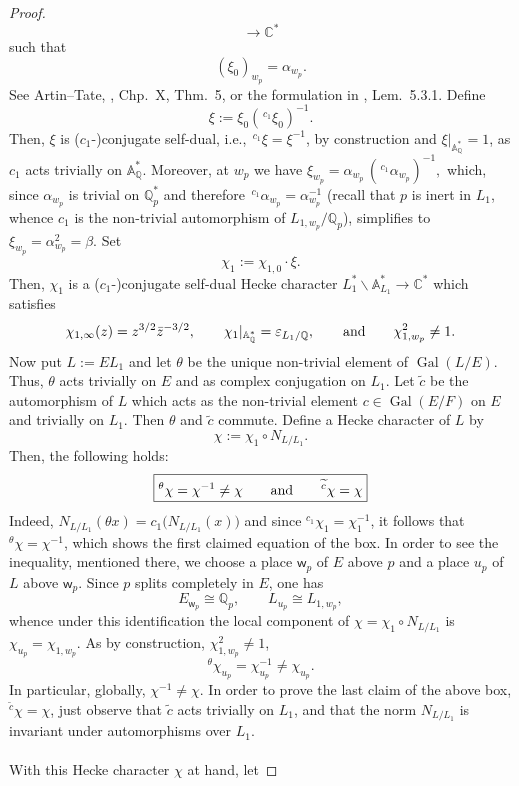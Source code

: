\documentclass[a4paper,10pt]{amsart}
\theoremstyle{definition}
\numberwithin{equation}{section}
\def\A{\mathbb A}
\def\Q{\mathbb Q}
\def\C{\mathbb C}
\def\ww{\mathsf w}
\begin{document}
\begin{proof}
$$        \longrightarrow \mathbb C^*
$$
such that
$$
        (\xi_0)_{w_p}=\alpha_{w_p} .
$$
See Artin--Tate, \cite{ArtinTate}, Chp.~X, Thm.~5, or the formulation in \cite{BCGNT}, Lem.\ 5.3.1.  Define
$$
        \xi:=\xi_0({}^{\,c_1}\xi_0)^{-1}.
$$
Then, $\xi$ is ($c_1$-)conjugate self-dual, i.e., ${}^{\,c_1}\xi=\xi^{-1}$, by construction and $\xi|_{\mathbb A_\mathbb Q^*}=1$, as \(c_1\) acts trivially on \(\mathbb A_\mathbb Q^*\). Moreover, at \(w_p\) we have $\xi_{w_p}=\alpha_{w_p}\,({}^{\,c_1}\alpha_{w_p})^{-1},$
which, since \(\alpha_{w_p}\) is trivial on \(\mathbb Q_p^*\) and therefore ${}^{\,c_1}\alpha_{w_p}=\alpha_{w_p}^{-1}$ (recall that $p$ is inert in $L_1$, whence $c_1$ is the non-trivial automorphism of $L_{1,w_p}/\Q_p$), simplifies to $\xi_{w_p} = \alpha_{w_p}^2 = \beta.$ Set
$$
        \chi_1:=\chi_{1,0}\cdot \xi.
$$
Then, $\chi_1$ is a ($c_1$-)conjugate self-dual Hecke character $L^*_1\backslash \A^*_{L_1}\rightarrow\C^*$ which satisfies
$$
        \chi_{1,\infty}(z)
        =
        z^{3/2}\bar z^{-3/2}, \quad\quad
        \chi_1|_{\mathbb A_\mathbb Q^*}
        =
        \varepsilon_{L_1/\mathbb Q},\quad\quad {\rm and} \quad\quad
        \chi_{1,w_p}^2\neq 1.
$$
Now put $L:=EL_1$ and let $\theta$ be the unique non-trivial element of \(\operatorname{Gal}(L/E)\). Thus, \(\theta\) acts trivially on \(E\) and as complex conjugation on \(L_1\). Let \(\widetilde c\) be the automorphism of \(L\) which acts as the non-trivial element \(c\in\operatorname{Gal}(E/F)\) on \(E\) and trivially on \(L_1\). Then \(\theta\) and \(\widetilde c\) commute. Define a Hecke character of \(L\) by
$$
        \chi:=\chi_1\circ N_{L/L_1}.
$$
Then, the following holds:
$$\boxed{{}^{\theta}\chi=\chi^{-1}\neq\chi \quad\quad {\rm and} \quad\quad {}^{\widetilde c}\chi=\chi}$$ 
Indeed, $N_{L/L_1}(\theta x)
        =
        c_1\bigl(N_{L/L_1}(x)\bigr)$ and since \({}^{c_1}\chi_1=\chi_1^{-1}\), it follows that ${}^\theta\chi=\chi^{-1}$, which shows the first claimed equation of the box. In order to see the inequality, mentioned there, we choose a place \(\ww_p\) of \(E\) above \(p\) and
a place \(u_p\) of \(L\) above \(\ww_p\). Since \(p\) splits completely in \(E\), one has
$$
        E_{\ww_p}\cong \mathbb Q_p,
        \qquad
        L_{u_p} \cong L_{1,w_p},
$$
whence under this identification the local component of
\(\chi=\chi_1\circ N_{L/L_1}\) is $\chi_{u_p}=\chi_{1,w_p}.$ As by construction, $\chi_{1,w_p}^2\neq 1$, 
$$
        {}^\theta\chi_{u_p}=\chi_{u_p}^{-1}\neq \chi_{u_p}.
$$
In particular, globally, $\chi^{-1}\neq \chi$. In order to prove the last claim of the above box, ${}^{\widetilde c}\chi=\chi$, just observe that \(\widetilde c\) acts trivially on \(L_1\), and that the norm \(N_{L/L_1}\) is invariant under automorphisms over \(L_1\).\\\\ With this Hecke character $\chi$ at hand, let

\end{proof}
\end{document}
